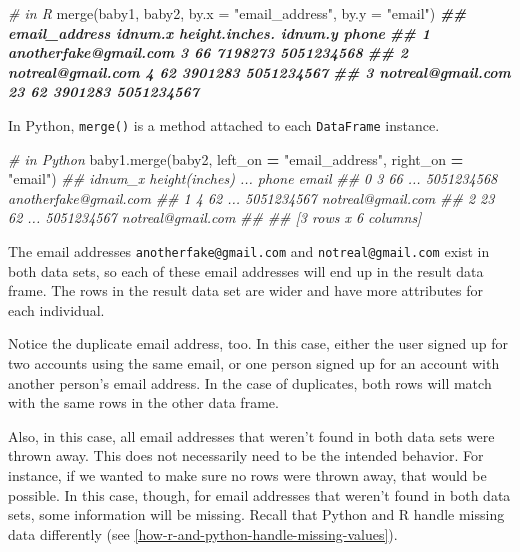 \documentclass[
  12pt,
  krantz2]{krantz}
\makeatletter
\newenvironment{Shaded}{\begin{snugshade}}{\end{snugshade}}
\newcommand{\AttributeTok}[1]{\textcolor[rgb]{0.61,0.61,0.61}{#1}}
\newcommand{\CommentTok}[1]{\textcolor[rgb]{0.37,0.37,0.37}{\textit{#1}}}
\newcommand{\DocumentationTok}[1]{\textcolor[rgb]{0.37,0.37,0.37}{\textbf{\textit{#1}}}}
\newcommand{\FunctionTok}[1]{\textcolor[rgb]{0,0,0}{#1}}
\newcommand{\NormalTok}[1]{#1}
\newcommand{\OperatorTok}[1]{\textcolor[rgb]{0.43,0.43,0.43}{\textbf{#1}}}
\newcommand{\StringTok}[1]{\textcolor[rgb]{0.5,0.5,0.5}{#1}}
\newenvironment{kframe}{%
\medskip{}
\setlength{\fboxsep}{.8em}
 \def\at@end@of@kframe{}%
 \ifinner\ifhmode%
  \def\at@end@of@kframe{\end{minipage}}%
  \begin{minipage}{\columnwidth}%
 \fi\fi%
 \def\FrameCommand##1{\hskip\@totalleftmargin \hskip-\fboxsep
 \colorbox{shadecolor}{##1}\hskip-\fboxsep
     \hskip-\linewidth \hskip-\@totalleftmargin \hskip\columnwidth}%
 \MakeFramed {\advance\hsize-\width
   \@totalleftmargin\z@ \linewidth\hsize
   \@setminipage}}%
 {\par\unskip\endMakeFramed%
 \at@end@of@kframe}
\renewenvironment{Shaded}{\begin{kframe}}{\end{kframe}}
\makeatother
\begin{document}
\begin{Shaded}
\begin{Highlighting}[]
\CommentTok{\# in R}
\FunctionTok{merge}\NormalTok{(baby1, baby2, }\AttributeTok{by.x =} \StringTok{"email\_address"}\NormalTok{, }\AttributeTok{by.y =} \StringTok{"email"}\NormalTok{)}
\DocumentationTok{\#\#           email\_address idnum.x height.inches. idnum.y      phone}
\DocumentationTok{\#\# 1 anotherfake@gmail.com       3             66 7198273 5051234568}
\DocumentationTok{\#\# 2     notreal@gmail.com       4             62 3901283 5051234567}
\DocumentationTok{\#\# 3     notreal@gmail.com      23             62 3901283 5051234567}
\end{Highlighting}
\end{Shaded}

In Python, \texttt{merge()} is a method attached to each \texttt{DataFrame} instance.

\begin{Shaded}
\begin{Highlighting}[]
\CommentTok{\# in Python}
\NormalTok{baby1.merge(baby2, left\_on }\OperatorTok{=} \StringTok{"email\_address"}\NormalTok{, right\_on }\OperatorTok{=} \StringTok{"email"}\NormalTok{)}
\CommentTok{\#\#    idnum\_x  height(inches)  ...       phone                  email}
\CommentTok{\#\# 0        3              66  ...  5051234568  anotherfake@gmail.com}
\CommentTok{\#\# 1        4              62  ...  5051234567      notreal@gmail.com}
\CommentTok{\#\# 2       23              62  ...  5051234567      notreal@gmail.com}
\CommentTok{\#\# }
\CommentTok{\#\# [3 rows x 6 columns]}
\end{Highlighting}
\end{Shaded}

The email addresses \texttt{anotherfake@gmail.com} and \texttt{notreal@gmail.com} exist in both data sets, so each of these email addresses will end up in the result data frame. The rows in the result data set are wider and have more attributes for each individual.

Notice the duplicate email address, too. In this case, either the user signed up for two accounts using the same email, or one person signed up for an account with another person's email address. In the case of duplicates, both rows will match with the same rows in the other data frame.

Also, in this case, all email addresses that weren't found in both data sets were thrown away. This does not necessarily need to be the intended behavior. For instance, if we wanted to make sure no rows were thrown away, that would be possible. In this case, though, for email addresses that weren't found in both data sets, some information will be missing. Recall that Python and R handle missing data differently (see \ref{how-r-and-python-handle-missing-values}).
\end{document}
